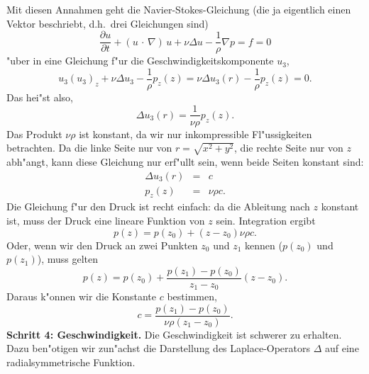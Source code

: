  Mit diesen Annahmen geht die 
Navier-Stokes-Gleichung (die ja eigentlich 
einen Vektor beschriebt, d.h.\ drei Gleichungen sind)
$$ \frac{\partial u }{\partial t} + (u\,\cdot\,\nabla)\, u+\nu\Delta u - \frac 1 \rho \nabla p = f=0
$$
"uber in eine Gleichung f"ur die Geschwindigkeitskomponente $u_3$,
$$ 
u_3(u_3)_z + \nu \Delta u_3 -  \frac 1 \rho p_z(z) =
 \nu \Delta u_3(r) -  \frac 1 \rho p_z(z) 
=0.
$$
Das hei"st also,
$$ \Delta u_3(r) = \frac 1{\nu\rho} p_z(z).$$
Das Produkt $\nu\rho$ ist konstant, da wir nur inkompressible Fl"ussigkeiten 
betrachten. Da die linke Seite nur von $r = \sqrt{x^2+y^2}$, die rechte Seite 
nur von $z$ abh"angt, kann diese Gleichung nur erf"ullt sein, wenn beide Seiten 
konstant sind:
\begin{eqnarray*}
\Delta u_3(r)  & = & c\\
p_z(z) & = & \nu\rho c.
\end{eqnarray*}
 Die Gleichung f"ur den Druck ist recht einfach: da die 
Ableitung nach $z$ konstant ist, muss der Druck eine lineare Funktion von $z$ 
sein. Integration ergibt
$$ p(z) = p(z_0) + (z-z_0) \nu\rho c.$$
Oder, wenn wir den Druck an zwei Punkten $z_0$ und $z_1$ kennen ($p(z_0)$ und 
$p(z_1)$), muss gelten
$$ p(z) = p(z_0) + \frac{p(z_1)-p(z_0)}{z_1-z_0} (z-z_0).$$
Daraus k"onnen wir die Konstante $c$ bestimmen, 
$$ c =  \frac{p(z_1)-p(z_0)}{\nu\rho(z_1-z_0)}.$$
{\bf Schritt 4: Geschwindigkeit.} Die Geschwindigkeit 
ist schwerer zu erhalten. 
Dazu ben"otigen wir zun"achst die Darstellung des Laplace-Operators $\Delta$ auf 
eine radialsymmetrische Funktion.

